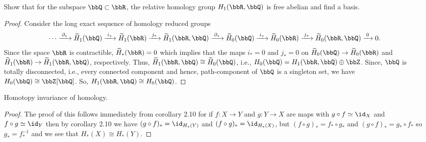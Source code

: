 \begin{problem}[Hatcher {\S}2.1, Ex.\,18]
Show that for the subspace $\bbQ\subset\bbR$, the relative homology group
$H_1(\bbR,\bbQ)$ is free abelian and find a basis.
\end{problem}
\begin{proof}
Consider the long exact sequence of homology reduced groups
\begin{equation}
  \label{eq:relative-short-exact-sequence-3}
\cdots\xrightarrow{\;\partial_*\;}
\widetilde H_1(\bbQ)\xrightarrow{\;i_*\;}
\widetilde H_1(\bbR)\xrightarrow{\;j_*\;}
\widetilde H_1(\bbR,\bbQ)\xrightarrow{\;\partial_*\;}
\widetilde H_0(\bbQ)\xrightarrow{\;i_*\;}
\widetilde H_0(\bbR)\xrightarrow{\;j_*\;}
\widetilde H_0(\bbR,\bbQ)\xrightarrow{\;0\;}0.
\end{equation}
Since the space $\bbR$ is contractible, $\widetilde H_*(\bbR)=0$ which
implies that the maps $i_*=0$ and $j_*=0$ on $\widetilde
H_0(\bbQ)\to\widetilde H_0(\bbR)$ and $\widetilde H_1(\bbR)\to\widetilde
H_1(\bbR,\bbQ)$, respectively. Thus, $\widetilde
H_1(\bbR,\bbQ)\cong\widetilde H_0(\bbQ)$, i.e.,
$H_0(\bbQ)=H_1(\bbR,\bbQ)\oplus\bbZ$. Since, $\bbQ$ is totally
disconnected, i.e., every connected component and hence, path-component of
$\bbQ$ is a singleton set, we have $H_0(\bbQ)\cong \bbZ[\bbQ]$. So,
$H_1(\bbR,\bbQ)\cong H_0(\bbQ)$.
\end{proof}

\newpage
\begin{problem}
Homotopy invariance of homology.
\end{problem}
\begin{proof}
The proof of this follows immediately from corollary 2.10 for if $f\colon
X\to Y$ and $g\colon Y\to X$ are maps with $g\circ f\simeq\id_X$ and
$f\circ g\simeq \id_Y$ then by corollary 2.10 we have $(g\circ
f)_*=\id_{H_*(Y)}$ and $(f\circ g)_*=\id_{H_*(X)}$, but $(f\circ
g)_*=f_*\circ g_*$ and $(g\circ f)_*=g_*\circ f_*$ so $g_*=f_*^{-1}$ and we
see that $H_*(X)\cong H_*(Y)$.
\end{proof}

